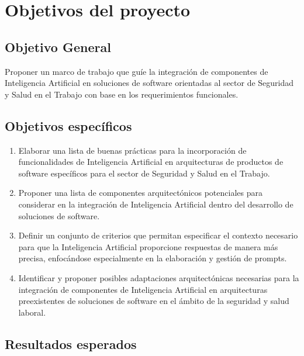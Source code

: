 \section{Objetivos del proyecto}
\subsection{Objetivo General}
 Proponer un marco de trabajo que guíe la integración de componentes de Inteligencia Artificial en soluciones de software orientadas al sector de Seguridad y Salud en el Trabajo con base en los requerimientos funcionales.


\subsection{Objetivos específicos}
\begin{enumerate}[label=\textbf{OE\arabic*:}]
    \item Elaborar una lista de buenas prácticas para la incorporación de funcionalidades de Inteligencia Artificial en arquitecturas de productos de software específicos para el sector de Seguridad y Salud en el Trabajo.
    \item Proponer una lista de componentes arquitectónicos potenciales para considerar en la integración de Inteligencia Artificial dentro del desarrollo de soluciones de software.
    \item Definir un conjunto de criterios que permitan especificar el contexto necesario para que la Inteligencia Artificial proporcione respuestas de manera más precisa, enfocándose especialmente en la elaboración y gestión de prompts.
    \item Identificar y proponer posibles adaptaciones arquitectónicas necesarias para la integración de componentes de Inteligencia Artificial en arquitecturas preexistentes de soluciones de software en el ámbito de la seguridad y salud laboral.
\end{enumerate}


\subsection{Resultados esperados}

